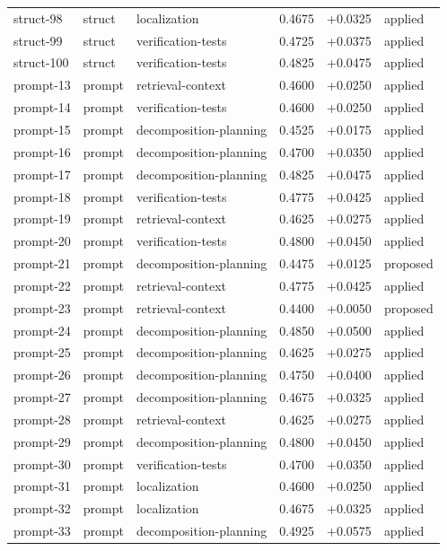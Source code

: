 \begin{center}
\begin{longtable}{llp{5.2cm}rrl}
struct-98 & struct & localization & 0.4675 & +0.0325 & applied \\
struct-99 & struct & verification-tests & 0.4725 & +0.0375 & applied \\
struct-100 & struct & verification-tests & 0.4825 & +0.0475 & applied \\
prompt-13 & prompt & retrieval-context & 0.4600 & +0.0250 & applied \\
prompt-14 & prompt & verification-tests & 0.4600 & +0.0250 & applied \\
prompt-15 & prompt & decomposition-planning & 0.4525 & +0.0175 & applied \\
prompt-16 & prompt & decomposition-planning & 0.4700 & +0.0350 & applied \\
prompt-17 & prompt & decomposition-planning & 0.4825 & +0.0475 & applied \\
prompt-18 & prompt & verification-tests & 0.4775 & +0.0425 & applied \\
prompt-19 & prompt & retrieval-context & 0.4625 & +0.0275 & applied \\
prompt-20 & prompt & verification-tests & 0.4800 & +0.0450 & applied \\
prompt-21 & prompt & decomposition-planning & 0.4475 & +0.0125 & proposed \\
prompt-22 & prompt & retrieval-context & 0.4775 & +0.0425 & applied \\
prompt-23 & prompt & retrieval-context & 0.4400 & +0.0050 & proposed \\
prompt-24 & prompt & decomposition-planning & 0.4850 & +0.0500 & applied \\
prompt-25 & prompt & decomposition-planning & 0.4625 & +0.0275 & applied \\
prompt-26 & prompt & decomposition-planning & 0.4750 & +0.0400 & applied \\
prompt-27 & prompt & decomposition-planning & 0.4675 & +0.0325 & applied \\
prompt-28 & prompt & retrieval-context & 0.4625 & +0.0275 & applied \\
prompt-29 & prompt & decomposition-planning & 0.4800 & +0.0450 & applied \\
prompt-30 & prompt & verification-tests & 0.4700 & +0.0350 & applied \\
prompt-31 & prompt & localization & 0.4600 & +0.0250 & applied \\
prompt-32 & prompt & localization & 0.4675 & +0.0325 & applied \\
prompt-33 & prompt & decomposition-planning & 0.4925 & +0.0575 & applied \\

\end{longtable}
\end{center}

